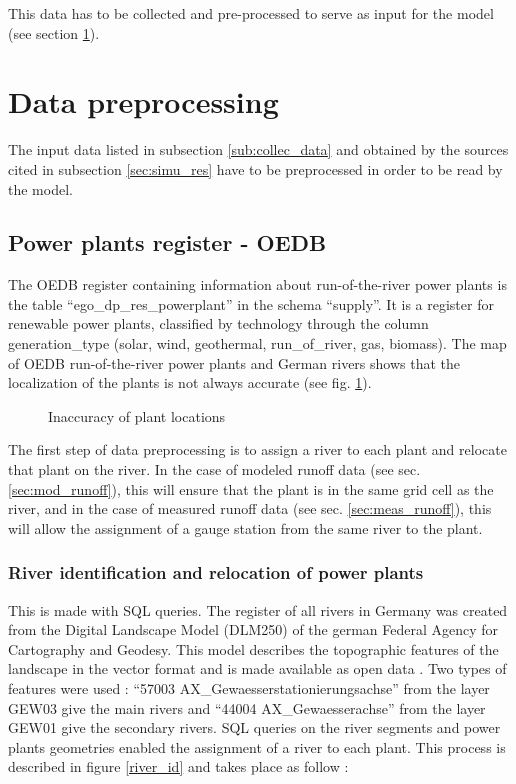 This data has to be collected and pre-processed to serve as input for the model (see section \ref{sec:data_preproc}).

\section{Data preprocessing}
\label{sec:data_preproc}
The input data listed in subsection \ref{sub:collec_data} and obtained by the sources cited in subsection \ref{sec:simu_res} have to be preprocessed in order to be read by the model.

\subsection{Power plants register - OEDB}
\label{sub:pp_reg}

The OEDB register containing information about run-of-the-river power plants is the table ``ego{\_}dp{\_}res{\_}powerplant'' in the schema ``supply''. It is a register for renewable power plants, classified by technology through the column generation{\_}type (solar, wind, geothermal, run{\_}of{\_}river, gas, biomass). \newline 
The map of OEDB run-of-the-river power plants and German rivers shows that the localization of the plants is not always accurate (see fig. \ref{pp_river_dist}).
\begin{figure}[H]
\center
{}
\caption{Inaccuracy of plant locations}
\label{pp_river_dist}
\end{figure}
The first step of data preprocessing is to assign a river to each plant and relocate that plant on the river. \newline
In the case of modeled runoff data (see sec. \ref{sec:mod_runoff}), this will ensure that the plant is in the same grid cell as the river, and in the case of measured runoff data (see sec. \ref{sec:meas_runoff}), this will allow the assignment of a gauge station from the same river to the plant.


\subsubsection*{River identification and relocation of power plants}

This is made with SQL queries. The register of all rivers in Germany was created from the Digital Landscape Model (DLM250) of the german Federal Agency for Cartography and Geodesy. This model describes the topographic features of the landscape in the vector format and is made available as open data \cite{dlm250}. \newline Two types of features were used : ``57003 AX{\_}Gewaesserstationierungsachse'' from the layer GEW03 give the main rivers and ``44004 AX{\_}Gewaesserachse'' from the layer GEW01 give the secondary rivers. \newline 
SQL queries on the river segments and power plants geometries enabled the assignment of a river to each plant. This process is described in figure \ref{river_id} and takes place as follow : 

